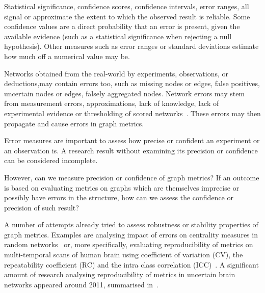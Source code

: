 Statistical significance, confidence scores, confidence intervals, error ranges, all signal or approximate the extent to which the observed result is reliable.
Some confidence values are a direct probability that an error is present, given the available evidence (such as a statistical significance when rejecting a null hypothesis).
Other measures such as error ranges or standard deviations estimate how much off a numerical value may be.

Networks obtained from the real-world by experiments, observations, or deductions,may contain errors too, such as missing nodes or edges, false positives, uncertain nodes or edges, falsely aggregated nodes.
Network errors may stem from measurement errors, approximations, lack of knowledge, lack of experimental evidence or thresholding of scored networks~\cite{Wang2012,MarsdenNetworkDataMeasurement1990,JonesChallengesLimitationsQuantifying2010}.
These errors may then propagate and cause errors in graph metrics.

Error measures are important to assess how precise or confident an experiment or an observation is.
A research result without examining its precision or confidence can be considered incomplete.\citeneeded{}

\parskip

However, can we measure precision or confidence of graph metrics?
If an outcome is based on evaluating metrics on graphs which are themselves imprecise or possibly have errors in the structure, how can we assess the confidence or precision of such result?

A number of attempts already tried to assess robustness or stability properties of graph metrics.
Examples are analysing impact of errors on centrality measures in random networks~\cite{BorgattiRobustnessCentralityMeasures2006} or, more specifically, evaluating reproducibility of metrics on multi-temporal scans of human brain using coefficient of variation (CV), the repeatability coefficient (RC) and the intra class correlation (ICC)~\cite{VaessenEffectReproducibilityDifferent2010,DennisTestRetestReliabilityGraph2012}.
A significant amount of research analysing reproducibility of metrics in uncertain brain networks appeared around 2011, summarised in~\cite{TelesfordExplorationGraphMetric2013}.


